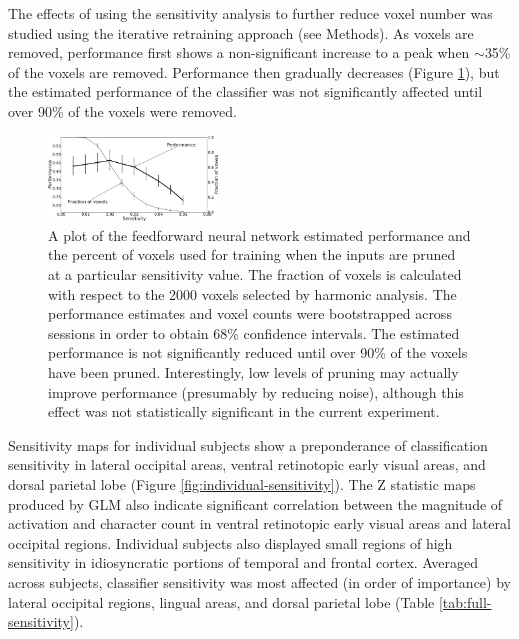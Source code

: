 \documentclass[5p,authoryear]{elsarticle}
\begin{document}
The effects of using the sensitivity analysis to further reduce voxel number was studied using the iterative retraining approach (see Methods).
As voxels are removed, performance first shows a non-significant increase to a peak when $\sim$35\% of the voxels are removed.
Performance then gradually decreases (Figure \ref{fig:sensitivity-cutoff}), but the estimated performance of the classifier was not significantly affected until over 90\% of the voxels were removed.

\begin{figure}
\centering
\includegraphics[width=0.4\textwidth]{figures/performance-verse-sensitivity-cutoff}
\caption{A plot of the feedforward neural network estimated performance and the percent of voxels used for training when the inputs are pruned at a particular sensitivity value.
The fraction of voxels is calculated with respect to the 2000 voxels selected by harmonic analysis.
The performance estimates and voxel counts were bootstrapped across sessions in order to obtain 68\% confidence intervals.
The estimated performance is not significantly reduced until over 90\% of the voxels have been pruned.
Interestingly, low levels of pruning may actually improve performance (presumably by reducing noise), although this effect was not statistically significant in the current experiment.} 
\label{fig:sensitivity-cutoff}
\end{figure}

Sensitivity maps for individual subjects show a preponderance of classification sensitivity in lateral occipital areas, ventral retinotopic early visual areas, and dorsal parietal lobe (Figure \ref{fig:individual-sensitivity}). 
The Z statistic maps produced by GLM also indicate significant correlation between the magnitude of activation and character count in ventral retinotopic early visual areas and lateral occipital regions.
Individual subjects also displayed small regions of high sensitivity in idiosyncratic portions of temporal and frontal cortex. 
Averaged across subjects, classifier sensitivity was most affected (in order of importance) by lateral occipital regions, lingual areas, and dorsal parietal lobe (Table \ref{tab:full-sensitivity}). 
\end{document}
